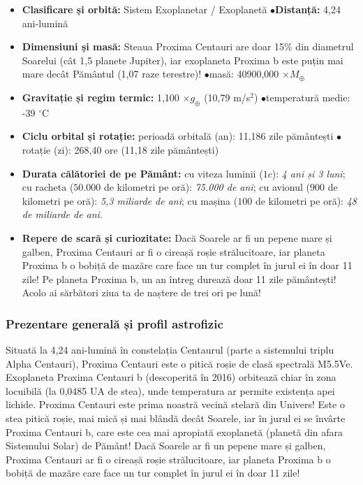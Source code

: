 \begin{tcolorbox}[orbitardata, title={\textbf{Repere esențiale: Proxima Centauri \& Proxima b}}]
\small
\begin{itemize}[leftmargin=1.4em, itemsep=2pt, topsep=2pt]
  \item \textbf{Clasificare și orbită:} Sistem Exoplanetar / Exoplanetă \quad$\bullet$\quad \textbf{Distanță:} 4,24 ani-lumină
  \item \textbf{Dimensiuni și masă:} Steaua Proxima Centauri are doar 15\% din diametrul Soarelui (cât 1,5 planete Jupiter), iar exoplaneta Proxima b este puțin mai mare decât Pământul (1,07 raze terestre)! \quad$\bullet$\quad masă: 40900,000 $\times M_\oplus$
  \item \textbf{Gravitație și regim termic:} 1,100 $\times g_\oplus$ (10,79 m/s$^2$) \quad$\bullet$\quad temperatură medie: -39 $^\circ$C
  \item \textbf{Ciclu orbital și rotație:} perioadă orbitală (an): 11,186 zile pământești \quad$\bullet$\quad rotație (zi): 268,40 ore (11,18 zile pământești)
  \item \textbf{Durata călătoriei de pe Pământ:} cu viteza luminii ($1c$): \emph{4 ani și 3 luni}; cu racheta ($50.000$ de kilometri pe oră): \emph{75.000 de ani}; cu avionul ($900$ de kilometri pe oră): \emph{5,3 miliarde de ani}; cu mașina ($100$ de kilometri pe oră): \emph{48 de miliarde de ani}.
  \item \textbf{Repere de scară și curiozitate:} Dacă Soarele ar fi un pepene mare și galben, Proxima Centauri ar fi o cireașă roșie strălucitoare, iar planeta Proxima b o bobiță de mazăre care face un tur complet în jurul ei în doar 11 zile! Pe planeta Proxima b, un an întreg durează doar 11 zile pământești! Acolo ai sărbători ziua ta de naștere de trei ori pe lună!
\end{itemize}
\end{tcolorbox}

\subsubsection*{Prezentare generală și profil astrofizic}
Situată la 4,24 ani-lumină în constelația Centaurul (parte a sistemului triplu Alpha Centauri), Proxima Centauri este o pitică roșie de clasă spectrală M5.5Ve. Exoplaneta Proxima Centauri b (descoperită în 2016) orbitează chiar în zona locuibilă (la 0,0485 UA de stea), unde temperatura ar permite existența apei lichide. Proxima Centauri este prima noastră vecină stelară din Univers! Este o stea pitică roșie, mai mică și mai blândă decât Soarele, iar în jurul ei se învârte Proxima Centauri b, care este cea mai apropiată exoplanetă (planetă din afara Sistemului Solar) de Pământ! Dacă Soarele ar fi un pepene mare și galben, Proxima Centauri ar fi o cireașă roșie strălucitoare, iar planeta Proxima b o bobiță de mazăre care face un tur complet în jurul ei în doar 11 zile!

